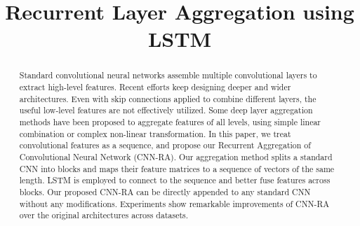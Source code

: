 \documentclass[conference]{IEEEtran}
\begin{document}
\title{Recurrent Layer Aggregation using LSTM}

\author{
\and
{}
\and
{}
\and
{}
}

\maketitle

\begin{abstract}
Standard convolutional neural networks assemble multiple convolutional layers to extract high-level features. Recent efforts keep designing deeper and wider architectures. Even with skip connections applied to combine different layers, the useful low-level features are not effectively utilized. Some deep layer aggregation methods have been proposed to aggregate features of all levels, using simple linear combination or complex non-linear transformation. In this paper, we treat convolutional features as a sequence, and propose our Recurrent Aggregation of Convolutional Neural Network (CNN-RA). Our aggregation method splits a standard CNN into blocks and maps their feature matrices to a sequence of vectors of the same length. LSTM is employed to connect to the sequence and better fuse features across blocks. Our proposed CNN-RA can be directly appended to any standard CNN without any modifications. Experiments show remarkable improvements of CNN-RA over the original architectures across datasets.
\end{abstract}
\end{document}
